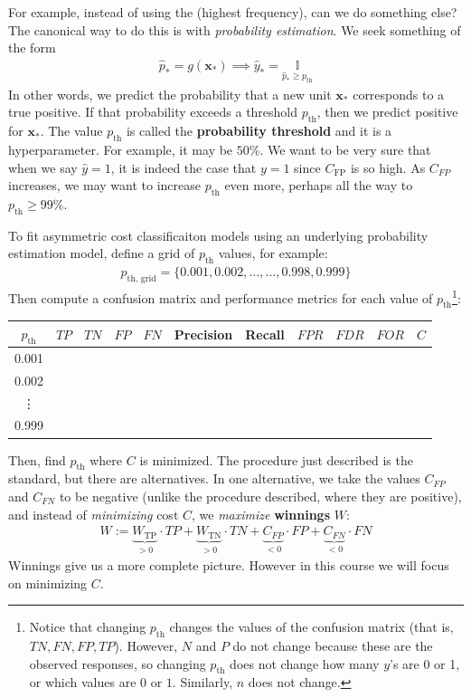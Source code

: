\documentclass[12pt, a4paper]{article}
\theoremstyle{definition}
\begin{document}
	For example, instead of using the  (highest frequency), can
	we do something else? The canonical way to do this is with
	\textit{probability estimation}. We seek something of the form
	\begin{align*}
		\hat{p}_{*} = g(\bm{x}_*) \implies
		\hat{y}_{*} = \underset{\hat{p}_* \geq p_{\text{th}}}{\mathbb{I}}
	\end{align*}
	In other words, we predict the probability that a new unit $\bm{x}_*$
	corresponds to a true positive. If that probability exceeds a threshold
	$p_{\text{th}}$, then we predict positive for $\bm{x}_*$.
	The value $p_{\text{th}}$ is called the \textbf{probability threshold}
	and it is a hyperparameter. For example, it may be $50\%$. We want
	to be very sure that when we say $\hat{y} = 1$, it is indeed the case
	that $y = 1$ since $C_{\text{FP}}$ is so high. As $C_{FP}$ increases,
	we may want to increase $p_{\text{th}}$ even more, perhaps all the way to
	$p_{\text{th}} \geq 99\%$.
	
	To fit asymmetric cost classificaiton models using an underlying probability
	estimation model, define a grid of $p_{\text{th}}$ values, for example:
	\begin{align*}
		p_{\text{th, grid}} = \{0.001, 0.002, \ldots, \ldots, 0.998, 0.999\}
	\end{align*}
	Then compute a confusion matrix and performance metrics for each value of
	$p_{\text{th}}$\footnote{Notice that changing $p_{\text{th}}$ changes the
	values of the confusion matrix (that is, $TN, FN, FP, TP$). However,
	$N$ and $P$ do not change because these are the observed responses,
	so changing $p_{\text{th}}$ does not change how many $y$'s are 0
	or 1, or which values are $0$ or $1$. Similarly, $n$ does not change.}:
	\begin{center}
		\begin{tabular}{c|c|c|c|c|c|c|c|c|c|c}
			$p_{\text{th}}$ & $TP$ & $TN$ & $FP$ & $FN$ & Precision & Recall & $FPR$ & $FDR$  & $FOR$ & $C$ \\
			\hline
 			0.001 & {} & {} & {} & {} & {} & {} & {} & {} & {} & {}\\
 			0.002 & {} & {} & {} & {} & {} & {} & {} & {} & {} & {}\\
 			\vdots & {} & {} & {} & {} & {} & {} & {} & {} & {} & {}\\
 			0.999 & {} & {} & {} & {} & {} & {} & {} & {} & {} & {}\\
		\end{tabular}
	\end{center}
	Then, find $p_{\text{th}}$ where $C$ is minimized. The procedure just described
	is the standard, but there are alternatives. In one alternative, we take
	the values $C_{FP}$ and $C_{FN}$ to be negative (unlike the procedure described,
	where they are positive), and instead of \textit{minimizing} cost $C$, we
	\textit{maximize} \textbf{winnings} $W$:
	\begin{align*}
		W := \underbrace{W_{\text{TP}}}_{>0}\cdot TP +
		\underbrace{W_{\text{TN}}}_{> 0}\cdot TN +
		\underbrace{C_{FP}}_{< 0} \cdot FP +
		\underbrace{C_{FN}}_{< 0} \cdot FN
	\end{align*}
	Winnings give us a more complete picture. However in this course we will
	focus on minimizing $C$.
	
\end{document}
